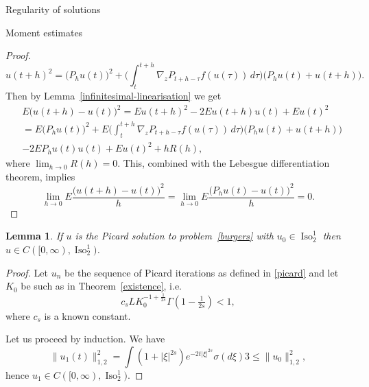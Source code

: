 \documentclass[a4paper,10pt,fleqn]{amsart}
\newtheorem{lemma}[theorem]{Lemma}
\theoremstyle{remark}
\theoremstyle{definition}
\DeclareMathOperator{\Iso}{Iso}
\newcommand{\grad} {\nabla_{\!z}}
\renewcommand{\=} {\overset{d}{=}}
\begin{document}
\begin{section}{Regularity of solutions}
\begin{subsection}{Moment estimates}
\begin{proof}
\begin{equation*}
      u(t+h)^2 = \big(P_hu(t)\big)^2 + \Big(\int_t^{t+h}\grad P_{t+h-\tau}f(u(\tau))\,d\tau\Big)\big(P_hu(t)+u(t+h)\big).
     \end{equation*}
     Then by Lemma~\ref{infinitesimal-linearisation} we get
     \begin{align*}
      &E\big(u(t+h)-u(t)\big)^2 
      = Eu(t+h)^2-2Eu(t+h)u(t)+Eu(t)^2\\
      &= E\big(P_hu(t)\big)^2 + E\Big(\int_t^{t+h}\grad P_{t+h-\tau}f(u(\tau))\,d\tau\Big)\big(P_hu(t)+u(t+h)\big)
      \\&-2EP_hu(t)u(t)+Eu(t)^2+hR(h),
     \end{align*}
     where $\lim_{h\to0} R(h)=0$.
     This, combined with the Lebesgue differentiation theorem, implies
     \begin{equation*}
      \lim_{h\to0}E\frac{\big(u(t+h)-u(t)\big)^2}{h}=\lim_{h\to0}E\frac{\big(P_hu(t)-u(t)\big)^2}{h}=  0.
     \end{equation*}
    \end{proof}
    
    \begin{lemma}\label{regularity}
     If $u$ is the Picard solution to problem~\eqref{burgers} with $u_0\in\Iso^1_2$
     then $u\in C([0,\infty),\Iso^1_2)$.
    \end{lemma}
    \begin{proof}
     Let $u_n$ be the sequence of Picard iterations as defined in \eqref{picard}
     and let $K_0$ be such as in Theorem~\ref{existence}, i.e.
     \begin{equation}\label{k0}
      c_sLK_0^{-1+\frac{1}{2s}}\Gamma(1-\tfrac{1}{2s}) < 1,
     \end{equation}
     where $c_s$ is a known constant.
     
     Let us proceed by induction.
     We have
     \begin{equation*}
      \|u_1(t)\|_{1,2}^2 = \int(1+|\xi|^{2s})e^{-2t|\xi|^{2s}}\sigma(d\xi)3
      \leq \|u_0\|_{1,2}^2,
     \end{equation*}
     hence $u_1\in C([0,\infty),\Iso^1_2)$.


\end{proof}
\end{subsection}
\end{section}
\end{document}
